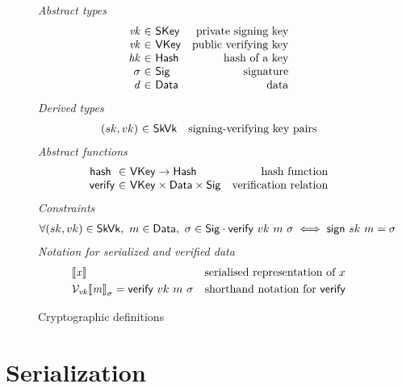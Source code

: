 \documentclass[11pt,a4paper]{article}
\newcommand{\VKey}{\type{VKey}}
\newcommand{\SKey}{\type{SKey}}
\newcommand{\Hash}{\type{Hash}}
\newcommand{\SkVk}{\type{SkVk}}
\newcommand{\Sig}{\type{Sig}}
\newcommand{\Data}{\type{Data}}
\newcommand{\verify}[3]{\fun{verify} ~ #1 ~ #2 ~ #3}
\newcommand{\sign}[2]{\fun{sign} ~ #1 ~ #2}
\newcommand{\serialised}[1]{\llbracket \var{#1} \rrbracket}
\newcommand{\hash}[1]{\fun{hash}~ \var{#1}}
\begin{document}
\begin{figure}
  \emph{Abstract types}
  \begin{equation*}
    \begin{array}{r@{~\in~}lr}
      \var{vk} & \SKey & \text{private signing key}\\
      \var{vk} & \VKey & \text{public verifying key}\\
      \var{hk} & \Hash & \text{hash of a key}\\
      \sigma & \Sig  & \text{signature}\\
      \var{d} & \Data  & \text{data}\\
    \end{array}
  \end{equation*}
  \emph{Derived types}
  \begin{equation*}
    \begin{array}{r@{~\in~}lr}
      (sk, vk) & \SkVk & \text{signing-verifying key pairs}
    \end{array}
  \end{equation*}
  \emph{Abstract functions}
  \begin{equation*}
    \begin{array}{r@{~\in~}lr}
      \hash{} & \VKey \to \Hash
      & \text{hash function} \\
      \fun{verify} & \VKey \times \Data \times \Sig
      & \text{verification relation}\\
    \end{array}
  \end{equation*}
  \emph{Constraints}
  \begin{align*}
    & \forall (sk, vk) \in \SkVk,~ m \in \Data,~ \sigma \in \Sig \cdot
      \verify{vk}{m}{\sigma} \iff \sign{sk}{m} = \sigma
  \end{align*}
  \emph{Notation for serialized and verified data}
  \begin{align*}
    & \serialised{x} & \text{serialised representation of } x\\
    & \mathcal{V}_{\var{vk}}{\serialised{m}}_{\sigma} = \verify{vk}{m}{\sigma}
      & \text{shorthand notation for } \fun{verify}
  \end{align*}
  \caption{Cryptographic definitions}
  \label{fig:crypto-defs}
\end{figure}

\section{Serialization}
\label{sec:serialization}
\end{document}
